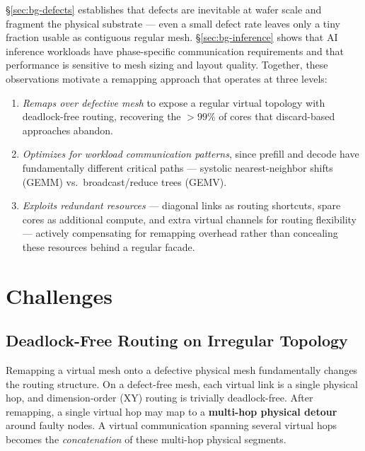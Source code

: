 \documentclass[sigplan,anonymous,review,nonacm]{acmart}
\begin{document}
\S\ref{sec:bg-defects} establishes that defects are inevitable at wafer scale and fragment the physical substrate --- even a small defect rate leaves only a tiny fraction usable as contiguous regular mesh. \S\ref{sec:bg-inference} shows that AI inference workloads have phase-specific communication requirements and that performance is sensitive to mesh sizing and layout quality. Together, these observations motivate a remapping approach that operates at three levels:

\begin{enumerate}
\item \emph{Remaps over defective mesh} to expose a regular virtual topology with deadlock-free routing, recovering the ${>}99\%$ of cores that discard-based approaches abandon.
\item \emph{Optimizes for workload communication patterns}, since prefill and decode have fundamentally different critical paths --- systolic nearest-neighbor shifts (GEMM) vs.\ broadcast/reduce trees (GEMV).
\item \emph{Exploits redundant resources} --- diagonal links as routing shortcuts, spare cores as additional compute, and extra virtual channels for routing flexibility --- actively compensating for remapping overhead rather than concealing these resources behind a regular facade.
\end{enumerate}


\section{Challenges}
\label{sec:challenges}


\subsection{Deadlock-Free Routing on Irregular Topology}
\label{sec:ch-deadlock}

Remapping a virtual mesh onto a defective physical mesh fundamentally changes the routing structure. On a defect-free mesh, each virtual link is a single physical hop, and dimension-order (XY) routing is trivially deadlock-free. After remapping, a single virtual hop may map to a \textbf{multi-hop physical detour} around faulty nodes. A virtual communication spanning several virtual hops becomes the \emph{concatenation} of these multi-hop physical segments.
\end{document}
